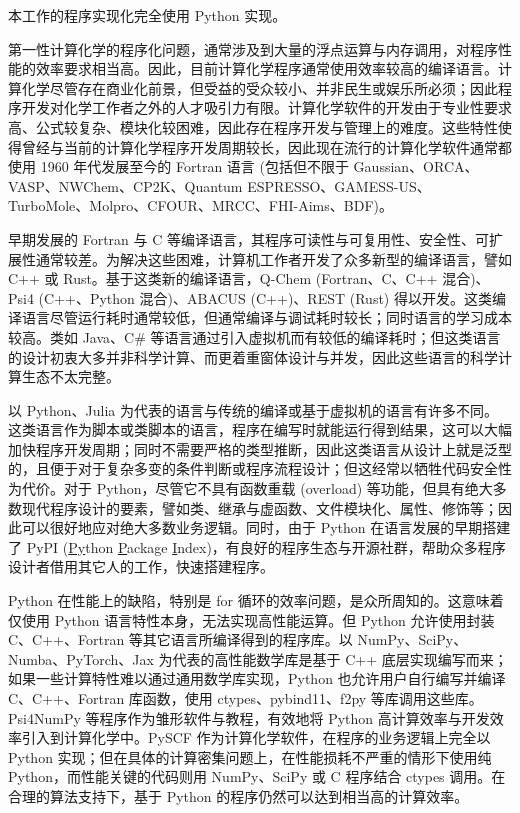 本工作的程序实现化完全使用 Python 实现。

第一性计算化学的程序化问题，通常涉及到大量的浮点运算与内存调用，对程序性能的效率要求相当高。因此，目前计算化学程序通常使用效率较高的编译语言。计算化学尽管存在商业化前景，但受益的受众较小、并非民生或娱乐所必须；因此程序开发对化学工作者之外的人才吸引力有限。计算化学软件的开发由于专业性要求高、公式较复杂、模块化较困难，因此存在程序开发与管理上的难度。这些特性使得曾经与当前的计算化学程序开发周期较长，因此现在流行的计算化学软件通常都使用 1960 年代发展至今的 Fortran 语言 (包括但不限于 Gaussian、ORCA、VASP、NWChem、CP2K、Quantum ESPRESSO、GAMESS-US、TurboMole、Molpro、CFOUR、MRCC、FHI-Aims、BDF)。

早期发展的 Fortran 与 C 等编译语言，其程序可读性与可复用性、安全性、可扩展性通常较差。为解决这些困难，计算机工作者开发了众多新型的编译语言，譬如 C++ 或 Rust。基于这类新的编译语言，Q-Chem (Fortran、C、C++ 混合)、Psi4 (C++、Python 混合)、ABACUS (C++)、REST (Rust) 得以开发。这类编译语言尽管运行耗时通常较低，但通常编译与调试耗时较长；同时语言的学习成本较高。类如 Java、C\# 等语言通过引入虚拟机而有较低的编译耗时；但这类语言的设计初衷大多并非科学计算、而更着重窗体设计与并发，因此这些语言的科学计算生态不太完整。

以 Python、Julia 为代表的语言与传统的编译或基于虚拟机的语言有许多不同。这类语言作为脚本或类脚本的语言，程序在编写时就能运行得到结果，这可以大幅加快程序开发周期；同时不需要严格的类型推断，因此这类语言从设计上就是泛型的，且便于对于复杂多变的条件判断或程序流程设计；但这经常以牺牲代码安全性为代价。对于 Python，尽管它不具有函数重载 (overload) 等功能，但具有绝大多数现代程序设计的要素，譬如类、继承与虚函数、文件模块化、属性、修饰等；因此可以很好地应对绝大多数业务逻辑。同时，由于 Python 在语言发展的早期搭建了 PyPI (\underline{Py}thon \underline{P}ackage \underline{I}ndex)，有良好的程序生态与开源社群，帮助众多程序设计者借用其它人的工作，快速搭建程序。

Python 在性能上的缺陷，特别是 for 循环的效率问题，是众所周知的。这意味着仅使用 Python 语言特性本身，无法实现高性能运算。但 Python 允许使用封装 C、C++、Fortran 等其它语言所编译得到的程序库。以 NumPy、SciPy、Numba、PyTorch、Jax 为代表的高性能数学库是基于 C++ 底层实现编写而来；如果一些计算特性难以通过通用数学库实现，Python 也允许用户自行编写并编译 C、C++、Fortran 库函数，使用 ctypes、pybind11、f2py 等库调用这些库。Psi4NumPy 等程序作为雏形软件与教程，有效地将 Python 高计算效率与开发效率引入到计算化学中。PySCF 作为计算化学软件，在程序的业务逻辑上完全以 Python 实现；但在具体的计算密集问题上，在性能损耗不严重的情形下使用纯 Python，而性能关键的代码则用 NumPy、SciPy 或 C 程序结合 ctypes 调用。在合理的算法支持下，基于 Python 的程序仍然可以达到相当高的计算效率。


